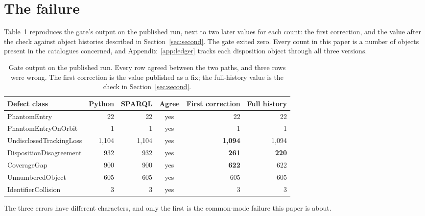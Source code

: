 \section{The failure}
\label{sec:failure}

Table~\ref{tab:gate} reproduces the gate's output on the published run, next to
two later values for each count: the first correction, and the value after the
check against object histories described in Section~\ref{sec:second}. The gate
exited zero. Every count in this paper is a number of objects present in the
catalogues concerned, and Appendix~\ref{app:ledger} tracks each disposition
object through all three versions.

\begin{table}[t]
\centering
\small
\caption{Gate output on the published run. Every row agreed between the two
paths, and three rows were wrong. The first correction is the value published
as a fix; the full-history value is the check in Section~\ref{sec:second}.}
\label{tab:gate}
\begin{tabular}{lrrcrr}
\toprule
Defect class & Python & SPARQL & Agree & First correction & Full history \\
\midrule
PhantomEntry              & 22    & 22    & yes & 22 & 22 \\
PhantomEntryOnOrbit       & 1     & 1     & yes & 1 & 1 \\
UndisclosedTrackingLoss   & 1{,}104 & 1{,}104 & yes & \textbf{1{,}094} & 1{,}094 \\
DispositionDisagreement   & 932   & 932   & yes & \textbf{261} & \textbf{220} \\
CoverageGap               & 900   & 900   & yes & \textbf{622} & 622 \\
UnnumberedObject          & 605   & 605   & yes & 605 & 605 \\
IdentifierCollision       & 3     & 3     & yes & 3 & 3 \\
\bottomrule
\end{tabular}
\end{table}

The three errors have different characters, and only the first is the
common-mode failure this paper is about.

